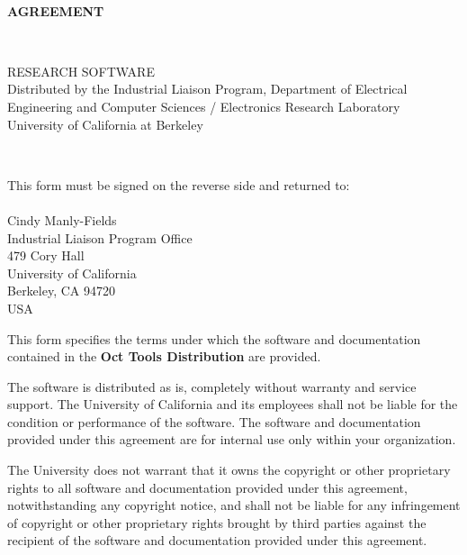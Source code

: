 

\ \\
{\huge {\bf AGREEMENT}}
\begin{large}
\\
\begin{bf}
RESEARCH SOFTWARE\\
Distributed by the Industrial Liaison Program, Department of
Electrical Engineering and Computer Sciences / Electronics Research
Laboratory\\
University of California at Berkeley
\end{bf}

\vspace*{2ex}

\ \\
\begin{bf}
This form must be signed on the reverse side and returned to:\\
\vspace*{2ex}\\
Cindy Manly-Fields\\
Industrial Liaison Program Office\\
479 Cory Hall\\
University of California\\
Berkeley, CA    94720\\
USA
\end{bf}
\end{large}

\vspace*{3ex}

This form specifies the terms under which the software and
documentation contained in the {\bf Oct Tools Distribution} are provided.

The software is distributed as is, completely without warranty and
service support.  The University of California and its employees shall
not be liable for the condition or performance of the software.  The
software and documentation provided under this agreement are for
internal use only within your organization.  

The University does not warrant that it owns the copyright or other
proprietary rights to all software and documentation provided under
this agreement, notwithstanding any copyright notice, and shall not be
liable for any infringement of copyright or other proprietary rights
brought by third parties against the recipient of the software and
documentation provided under this agreement.

